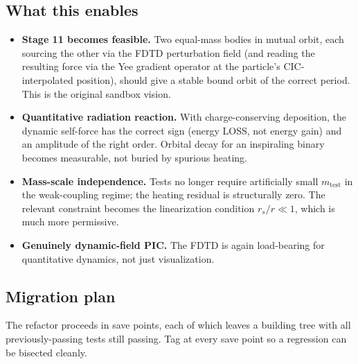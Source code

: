 \documentclass[11pt,a4paper]{article}
\begin{document}
\subsection{What this enables}

\begin{itemize}
  \item \textbf{Stage 11 becomes feasible.}  Two equal-mass bodies in
        mutual orbit, each sourcing the other via the FDTD perturbation
        field (and reading the resulting force via the Yee gradient
        operator at the particle's CIC-interpolated position), should
        give a stable bound orbit of the correct period.  This is the
        original sandbox vision.
  \item \textbf{Quantitative radiation reaction.}  With
        charge-conserving deposition, the dynamic self-force has the
        correct sign (energy LOSS, not energy gain) and an amplitude
        of the right order.  Orbital decay for an inspiraling binary
        becomes measurable, not buried by spurious heating.
  \item \textbf{Mass-scale independence.}  Tests no longer require
        artificially small $m_{\mathrm{test}}$ in the weak-coupling
        regime; the heating residual is structurally zero.  The
        relevant constraint becomes the linearization condition
        $r_s/r \ll 1$, which is much more permissive.
  \item \textbf{Genuinely dynamic-field PIC.}  The FDTD is again
        load-bearing for quantitative dynamics, not just visualization.
\end{itemize}

\subsection{Migration plan}
\label{sec:yee_migration_plan}

The refactor proceeds in save points, each of which leaves a building
tree with all previously-passing tests still passing.  Tag at every
save point so a regression can be bisected cleanly.
\end{document}
